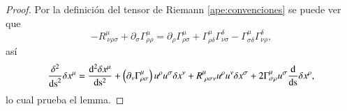 \begin{proof}
Por la definición del tensor de Riemann \ref{ape:convenciones} se puede ver que
\begin{equation}
\label{eq:16}
-R^{\mu}_{\ \nu \rho \sigma} + \partial_{\sigma} \Gamma^{\mu}_{\rho \rho} = \partial_{\rho} \Gamma^{\mu}_{\rho \sigma} + \Gamma^{\mu}_{\rho \delta} \Gamma^{\delta}_{\nu \sigma} - \Gamma^{\mu}_{\sigma \delta} \Gamma^{\delta}_{\nu \rho},
\end{equation}
así
\begin{equation}
\frac{\delta^2}{\mathrm{ds}^2}\delta x^{\mu} = \dv[2]{\delta x^{\mu}}{ \mathrm{s} } + \left( \partial_{\nu} \Gamma^{\mu}_{\rho \sigma} \right) u^{\rho} u^{\sigma} \delta x^{\nu} + R^{\mu}_{\ \rho \sigma \nu} u^{\rho} u^{\nu} \delta x^{\sigma} + 2 \Gamma^{\mu}_{\sigma \rho} u^{\sigma} \dv{ }{ \mathrm{s} } \delta x^{\rho},
\end{equation}
lo cual prueba el lemma.
\end{proof}

